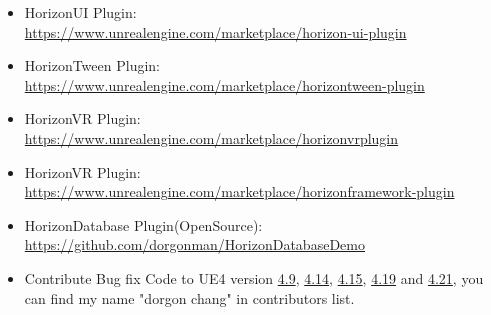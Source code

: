 \documentclass[a4paper,12pt]{memoir} %
\begin{document}

\newpage


\userinformation %

\framebreak %




{
  \begin{itemize}

    \item HorizonUI Plugin: \\
        \href{https://www.unrealengine.com/marketplace/horizon-ui-plugin}
             {https://www.unrealengine.com/marketplace/horizon-ui-plugin} \\
    \item HorizonTween Plugin: \\
        \href{https://www.unrealengine.com/marketplace/horizontween-plugin}
             {https://www.unrealengine.com/marketplace/horizontween-plugin} \\
    \item HorizonVR Plugin: \\
          \href{https://www.unrealengine.com/marketplace/horizonvrplugin}
               {https://www.unrealengine.com/marketplace/horizonvrplugin} \\
    \item HorizonVR Plugin: \\
          \href{https://www.unrealengine.com/marketplace/horizonframework-plugin}
               {https://www.unrealengine.com/marketplace/horizonframework-plugin} \\
    \item HorizonDatabase Plugin(OpenSource): \\
          \href{https://github.com/dorgonman/HorizonDatabaseDemo}
              {https://github.com/dorgonman/HorizonDatabaseDemo}  \\
              
    \item Contribute Bug fix Code to UE4 version 
    \href{https://docs.unrealengine.com/latest/INT/Support/Builds/ReleaseNotes/2015/4_9/index.html}{4.9}, 
    \href{https://docs.unrealengine.com/latest/INT/Support/Builds/ReleaseNotes/2016/4_14/index.html}{4.14}, 
    \href{https://docs.unrealengine.com/latest/INT/Support/Builds/ReleaseNotes/4_15/}{4.15},  
    \href{https://docs.unrealengine.com/latest/INT/Support/Builds/ReleaseNotes/4_19/}{4.19} and 
    \href{https://docs.unrealengine.com/latest/INT/Support/Builds/ReleaseNotes/4_21/}{4.21}, you can find my name "dorgon chang" in contributors list. \\


\end{itemize}}
\end{document}
